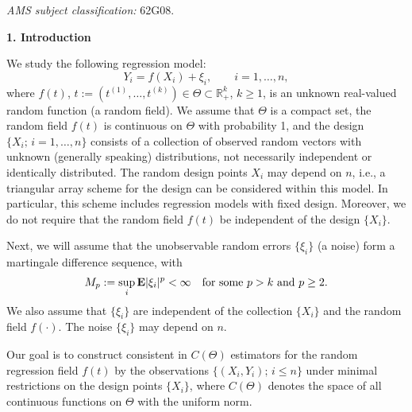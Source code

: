 \documentclass[12pt]{article}
\theoremstyle{remark}
\begin{document}
 {\it AMS subject classification:} 62G08.
 \begin{center}
\vspace{0.5cm}

{\bf 1. Introduction}
\end{center}
We study the following
regression model:
 \begin{equation}  \label{f2}
 Y_i=f(X_i)+\xi_i,
 \qquad i=1,\ldots,n,
 \end{equation}
where $f(t)$,  $t:=(t^{(1)},\ldots,t^{(k)})\in \Theta\subset {\mathbb R}_+^k$, $k\ge 1$, is an unknown real-valued random function (a random field). We assume that $\Theta$ is a compact set,
the random field $f(t)$ is continuous  on $\Theta$ with probability 1, and
the design $\{X_i;\,i=1,\ldots,n\}$ consists of a collection of  observed random vectors with unknown   (generally speaking) distributions,  not necessarily independent or identi\-cally distributed.
The random design points $X_i$ may depend on $n$, i.e.,
a triangular array scheme for the design can be considered within this model.
In particular, this scheme includes regression models with fixed design.
Moreover, we do not require that the random field $f(t)$ be
independent of the design $\{X_i\}$.

Next, we will assume that the unobservable random errors $\{\xi_i\}$ (a noise) form a martingale difference sequence, with
\begin{equation}  \label{xi}
M_p:=\sup_i{\bf E}|\xi_i|^p<\infty \quad\mbox{for some} \,\, p>k \,\,\mbox{and}\,\, p\ge 2.
\end{equation}
We also assume that $\{\xi_i\}$ are independent of the collection $\{X_i\}$ and the random field $f(\cdot)$. The noise $\{\xi_i\}$ may depend on $n$.

Our goal is to construct consistent in $C(\Theta)$ estimators for the random regression field $f(t)$ by the observations $\{(X_i,Y_i);\, i\le n\}$
under minimal restrictions on the design points $\{X_i\}$, where $C(\Theta)$ denotes the space of all continuous functions on $\Theta$ with the uniform norm.
\end{document}
